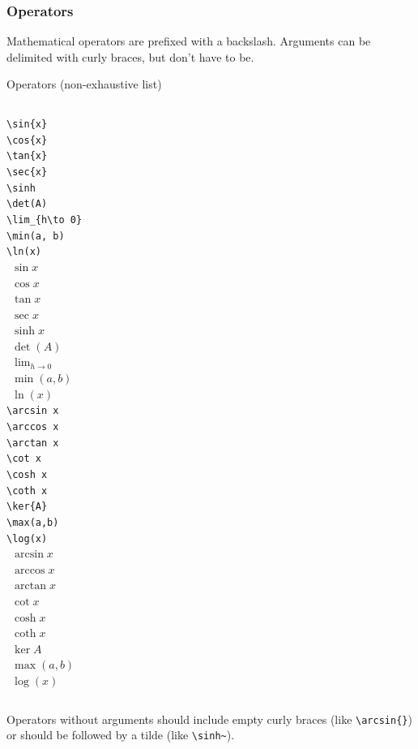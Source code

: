 \begin{frame}[fragile]
\frametitle{Operators}
    Mathematical operators are prefixed with a backslash. Arguments can be delimited with curly braces, but don't have to be.
\begin{block}{Operators (non-exhaustive list)}
    \begin{columns}
        \verb|\sin{x}| \\
        \verb|\cos{x}| \\
        \verb|\tan{x}| \\
        \verb|\sec{x}| \\
        \verb|\sinh | \\
        \verb|\det(A)| \\
        \verb|\lim_{h\to 0}| \\
        \verb|\min(a, b)| \\
        \verb|\ln(x)| \\
        $~~ \sin{x} $ \\
        $~~ \cos{x} $ \\
        $~~ \tan{x} $ \\
        $~~ \sec{x} $ \\
        $~~ \sinh x $ \\
        $~~ \det(A)$\\
        $~~ \lim_{h \to 0 } $ \\
        $~~ \min(a,b)$ \\
        $~~ \ln(x)$ \\
        \verb|\arcsin x| \\
        \verb|\arccos x| \\
        \verb|\arctan x| \\
        \verb|\cot x| \\
        \verb|\cosh x| \\
        \verb|\coth x| \\
        \verb|\ker{A}| \\
        \verb|\max(a,b) | \\
        \verb|\log(x) | \\
        $~~ \arcsin x $ \\
        $~~ \arccos x $ \\
        $~~ \arctan x $ \\
        $~~ \cot x $ \\
        $~~ \cosh x $ \\
        $~~ \coth x $ \\
        $~~ \ker{A} $ \\
        $~~ \max(a,b)$ \\
        $~~ \log(x) $
    \end{columns}
\end{block}
Operators without arguments should include empty curly braces (like \verb|\arcsin{}|) or should be followed by a tilde (like \verb|\sinh~|).
\end{frame}


